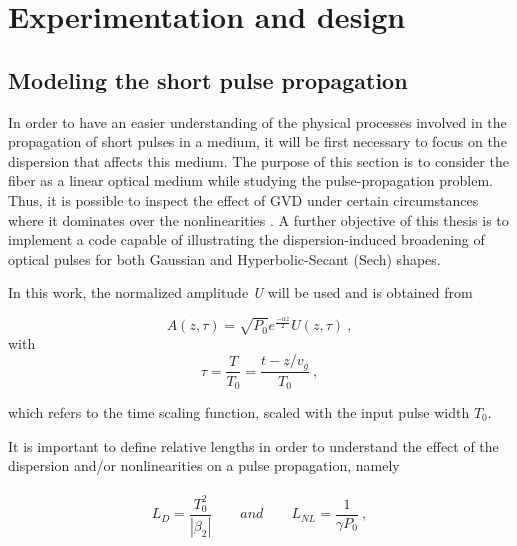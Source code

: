 \chapter{Experimentation and design}
\label{python}


 \section{Modeling the short  pulse propagation}
    In order to have an easier understanding of the physical processes involved in the propagation of short pulses in a medium, it will be first necessary to focus on the dispersion that affects this medium. The purpose of this section is to consider the fiber as a linear optical medium while studying the pulse-propagation problem. Thus, it is possible to inspect the effect of GVD under certain circumstances where it dominates over the nonlinearities \citep{ AgrawalBook}. A further objective of this thesis is to implement a code capable of illustrating the dispersion-induced broadening of optical pulses for both Gaussian and Hyperbolic-Secant (Sech) shapes.


    In this work, the normalized amplitude \emph{U} will be used and is obtained from  
  
            \begin{equation}\label{eq_A0}
                A(z,\tau ) = \sqrt{P_0}e^{\frac{-\alpha z}{2}} U(z,\tau) \ ,
            \end{equation}
            with
            \begin{equation}
                \tau =  \frac{T}{T_0} = \frac{t-z/v_g}{T_0} \ ,
            \end{equation}
        
        which refers to the time scaling function, scaled with the input pulse width $T_0$.
        
        
        It is important to define relative lengths in order to understand the effect of the dispersion and/or nonlinearities on a pulse propagation, namely
            \ \\
            \ \\
            \begin{equation}
                L_D = \frac{T^2_0}{|\beta_2|} \qquad and \qquad L_{NL} = \frac{1}{\gamma P_0} \ ,
            \end{equation}
        
